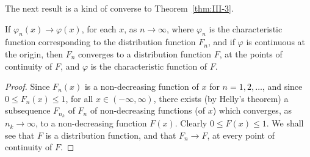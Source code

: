 The next result is a kind of converse to Theorem~\ref{thm:III-3}.

\begin{theorem}\label{thm:III-4}
If $\varphi_{n}(x)\to\varphi(x)$, for each $x$, as $n\to\infty$, where $\varphi_{n}$ is the characteristic function corresponding to the distribution function $F_{n}$, and if $\varphi$ is continuous at the origin, then $F_{n}$ converges to a distribution function $F$, at the points of continuity of $F$, and $\varphi$ is the characteristic function of $F$.
\end{theorem}

\begin{proof}
Since $F_{n}(x)$ is a non-decreasing function of $x$ for $n=1,2,\dots$, and since $0\le F_{n}(x)\le1$, for all $x\in(-\infty,\infty)$, there exists (by Helly's theorem) a subsequence $F_{n_{k}}$ of $F_{n}$ of non-decreasing functions (of $x$) which converges, as $n_{k}\to\infty$, to a non-decreasing function $F(x)$. Clearly $0\le F(x)\le1$. We shall see that $F$ is a distribution function, and that $F_{n}\to F$, at every point of continuity of $F$.


\end{proof}
